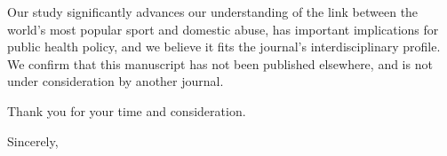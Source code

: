 \documentclass{letter}
\begin{document}
\begin{letter}
Our study significantly advances our understanding of the link between the world's most popular sport and domestic abuse, has important implications for public health policy, and we believe it fits the journal's interdisciplinary profile. We confirm that this manuscript has not been published elsewhere, and is not under consideration by another journal.

Thank you for your time and consideration.

\closing{Sincerely,}



\end{letter}
\end{document}
